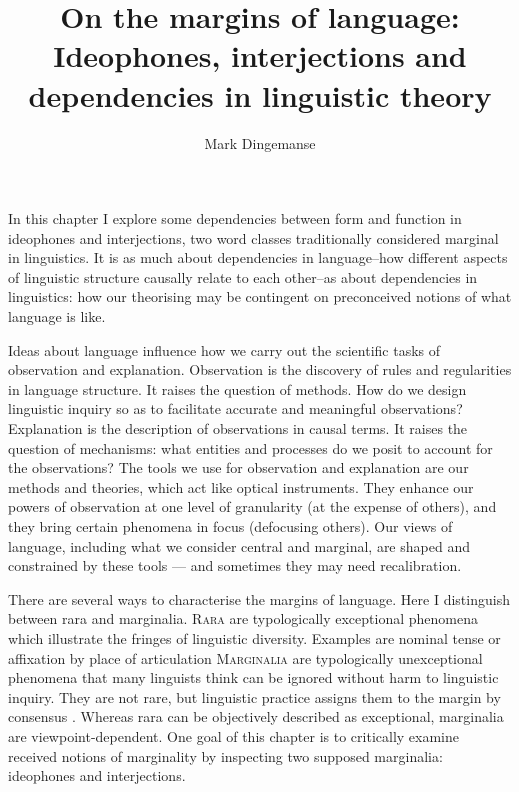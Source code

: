 \documentclass[output=paper]{langsci/langscibook}
\author{Mark Dingemanse\affiliation{MPI for Psycholinguistics, Nijmegen}}
\title{On the margins of language: Ideophones, interjections and dependencies in linguistic theory}
\begin{document}
\maketitle

  
\noindent In this chapter I explore some dependencies between form and function in ideophones and interjections, two word classes traditionally considered marginal in linguistics. It is as much about dependencies in language--how different aspects of linguistic structure causally relate to each other--as about dependencies in linguistics: how our theorising may be contingent on preconceived notions of what language is like. 


Ideas about language influence how we carry out the scientific tasks of observation and explanation. Observation is the discovery of rules and regularities in language structure. It raises the question of methods. How do we design linguistic inquiry so as to facilitate accurate and meaningful observations? Explanation is the description of observations in causal terms. It raises the question of mechanisms: what entities and processes do we posit to account for the observations? The tools we use for observation and explanation are our methods and theories, which act like optical instruments. They enhance our powers of observation at one level of granularity (at the expense of others), and they bring certain phenomena in focus (defocusing others). Our views of language, including what we consider central and marginal, are shaped and constrained by these tools — and sometimes they may need recalibration.



  There are several ways to characterise the margins of language. Here I distinguish between rara and marginalia. \textsc{Rara} are typologically exceptional phenomena which illustrate the fringes of linguistic diversity. Examples are nominal tense or affixation by place of articulation \citep{Wohlgemuth2010} \textsc{Marginalia} are typologically unexceptional phenomena that many linguists think can be ignored without harm to linguistic inquiry. They are not rare, but linguistic practice assigns them to the margin by consensus \citep{Joseph1997}. Whereas rara can be objectively described as exceptional, marginalia are viewpoint-depen\-dent. One goal of this chapter is to critically examine received notions of marginality by inspecting two supposed marginalia: ideophones and interjections.   
\end{document}
